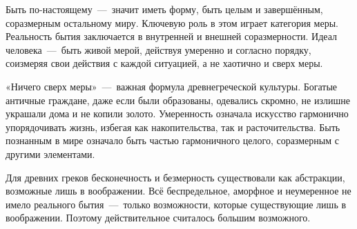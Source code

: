 \begin{enumerate}
Быть по-настоящему~---~значит иметь форму, быть целым и завершённым, соразмерным остальному миру. Ключевую роль в этом играет категория меры. Реальность бытия заключается в внутренней и внешней соразмерности. Идеал человека~---~быть живой мерой, действуя умеренно и согласно порядку, соизмеряя свои действия с каждой ситуацией, а не хаотично и сверх меры.


«Ничего сверх меры»~---~важная формула древнегреческой культуры. Богатые античные граждане, даже если были образованы, одевались скромно, не излишне украшали дома и не копили золото. Умеренность означала искусство гармонично упорядочивать жизнь, избегая как накопительства, так и расточительства. Быть познанным в мире означало быть частью гармоничного целого, соразмерным с другими элементами.


Для древних греков бесконечность и безмерность существовали как абстракции, возможные лишь в воображении. Всё беспредельное, аморфное и неумеренное не имело реального бытия~---~только возможности, которые существующие лишь в воображении. Поэтому действительное считалось большим возможного.


\end{enumerate}
